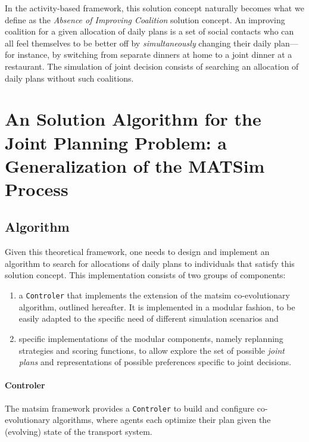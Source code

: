 {In the activity-based framework, this solution concept naturally becomes what we define as the \emph{Absence of Improving Coalition} solution concept. An improving coalition for a given allocation of daily plans is a set of social contacts who can all feel themselves to be better off by \emph{simultaneously} changing their daily plan---for instance, by switching from separate dinners at home to a joint dinner at a restaurant.
The simulation of joint decision consists of searching an allocation of daily plans without such coalitions.

\section{An Solution Algorithm for the Joint Planning Problem: a Generalization of the MATSim Process}
\label{sec:td:algo}
\subsection{Algorithm}
Given this theoretical framework, one needs to design and implement an algorithm to search for allocations of daily plans to individuals that satisfy this solution concept. This implementation consists of two groups of components:
%
\begin{enumerate}\styleEnumerate
\item a \lstinline|Controler| that implements the extension of the \gls{matsim} co-evolutionary algorithm, outlined hereafter. It is implemented in a modular fashion, to be easily adapted to the specific need of different simulation scenarios and
\item specific implementations of the modular components, namely replanning strategies and scoring functions, to allow explore the set of possible \emph{joint plans} and representations of possible preferences specific to joint decisions.
\end{enumerate}

\paragraph{Controler}

The \gls{matsim} framework provides a \lstinline|Controler| to build and configure co-evolutionary algorithms, where agents each optimize their plan given the (evolving) state of the transport system.

}
